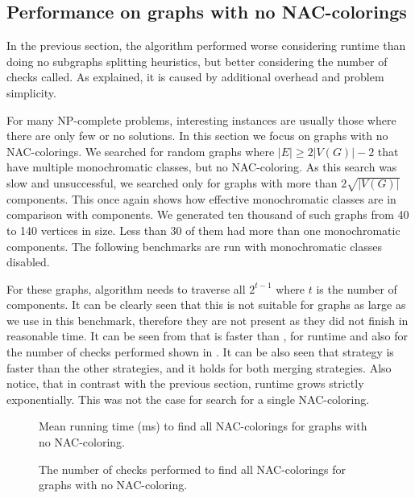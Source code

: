 \subsection{Performance on graphs with no NAC-colorings}

In the previous section, the \Subgraphs{} algorithm performed worse considering runtime
than doing no subgraphs splitting heuristics,
but better considering the number of checks called.
As explained, it is caused by additional overhead and problem simplicity.

For many NP-complete problems, interesting instances are usually
those where there are only few or no solutions.
In this section we focus on graphs with no NAC-colorings.
We searched for random graphs where \( |E| \ge 2|V(G)| - 2 \) that have
multiple monochromatic classes, but no NAC-coloring.
As this search was slow and unsuccessful, we searched only for
graphs with more than \( 2\sqrt{|V(G)|} \) \trcon{} components.
This once again shows how effective monochromatic classes are
in comparison with \trcon{} components.
We generated ten thousand of such graphs from 40 to 140 vertices in size.
Less than 30 of them had more than one monochromatic components.
The following benchmarks are run with monochromatic classes disabled.

For these graphs, \NaiveCycles{} algorithm needs to traverse all \( 2^{t-1} \)
where \( t \) is the number of \trcon{} components. It can be clearly seen that
this is not suitable for graphs as large as we use in this benchmark,
therefore they are not present as they did not finish in reasonable time.
It can be seen from 
that \SharedVertices{} is faster than \MergeLinear{},
for runtime and also for the number of checks performed
shown in .
It can be also seen that \NeighborsDegree{} strategy is
faster than the other strategies, and it holds for both merging strategies.
Also notice, that in contrast with the previous section,
runtime grows strictly exponentially. This was not the case for search for a single NAC-coloring.

\begin{figure}[p]
	\centering
	\scalebox{0.5}{}
	\caption[Mean runtime for graphs with no NAC-coloring (some).]{
		Mean running time (ms) to find all NAC-colorings for graphs with no NAC-coloring.}%
	\label{fig:graph_no_nac_coloring_first_runtime}
\end{figure}
\begin{figure}[p]
	\centering
	\scalebox{0.5}{}
	\caption[Checks performed for graphs with no NAC-coloring (some).]{
		The number of checks performed to find all NAC-colorings for graphs with no NAC-coloring.}%
	\label{fig:graph_no_nac_coloring_first_checks}
\end{figure}

